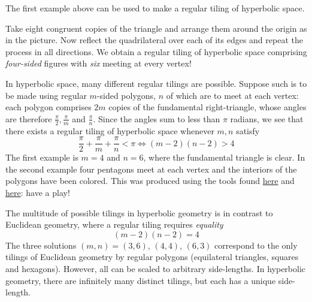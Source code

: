 The first example above can be used to make a regular tiling of hyperbolic space.\par

\begin{minipage}[t]{0.55\linewidth}\vspace{0pt}
Take eight congruent copies of the triangle and arrange them around the origin as in the picture. Now reflect the quadrilateral over each of its edges and repeat the process in all directions. We obtain a regular tiling of hyperbolic space comprising \emph{four-sided} figures with \emph{six} meeting at every vertex!\medbreak

In hyperbolic space, many different regular tilings are possible. Suppose such is to be made using regular $m$-sided polygons, $n$ of which are to meet at each vertex: each polygon comprises $2m$ copies of the fundamental right-triangle, whose angles are therefore $\frac\pi 2, \frac\pi m$ and $\frac\pi n$.
Since the angles sum to less than $\pi$ radians, we see that there exists a regular tiling of hyperbolic space whenever $m,n$ satisfy
\[\frac\pi 2+\frac\pi m+\frac\pi n<\pi\iff (m-2)(n-2)>4\]
The first example is $m=4$ and $n=6$, where the fundamental triangle is clear. In the second example four pentagons meet at each vertex and the interiors of the polygons have been colored. This was produced using the tools found
\href{http://www.malinc.se/noneuclidean/en/poincaretiling.php}{here} and \href{http://www.malinc.se/m/ImageTiling.php}{here}: have a play!\medbreak

The multitude of possible tilings in hyperbolic geometry is in contrast to Euclidean geometry, where a regular tiling requires \emph{equality}
\[(m-2)(n-2)=4\]
The three solutions $(m,n)=(3,6)$, $(4,4)$, $(6,3)$ correspond to the only tilings of Euclidean geometry by regular polygons (equilateral triangles, squares and hexagons). However, all can be scaled to arbitrary side-lengths. In hyperbolic geometry, there are infinitely many distinct tilings, but each has a unique side-length.\bigbreak


\end{minipage}

